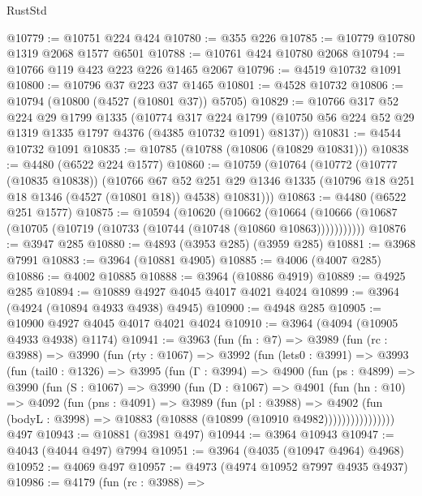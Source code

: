\begin{lexlean}{RustStd}
\begin{coremodule}
@10779 := @10751 @224 @424
@10780 := @355 @226
@10785 := @10779 @10780 @1319 @2068 @1577 @6501
@10788 := @10761 @424 @10780 @2068
@10794 := @10766 @119 @423 @223 @226 @1465 @2067
@10796 := @4519 @10732 @1091
@10800 := @10796 @37 @223 @37 @1465
@10801 := @4528 @10732
@10806 := @10794 (@10800 (@4527 (@10801 @37)) @5705)
@10829 := @10766
    @317
    @52
    @224
    @29
    @1799
    @1335
    (@10774
      @317
      @224
      @1799
      (@10750 @56 @224 @52 @29 @1319 @1335 @1797 @4376 (@4385 @10732 @1091) @8137))
@10831 := @4544 @10732 @1091
@10835 := @10785 (@10788 (@10806 (@10829 @10831)))
@10838 := @4480 (@6522 @224 @1577)
@10860 := @10759
    (@10764
      (@10772
        (@10777 (@10835 @10838))
        (@10766
          @67
          @52
          @251
          @29
          @1346
          @1335
          (@10796 @18 @251 @18 @1346 (@4527 (@10801 @18)) @4538)
          @10831)))
@10863 := @4480 (@6522 @251 @1577)
@10875 := @10594
    (@10620
      (@10662
        (@10664 (@10666 (@10687 (@10705 (@10719 (@10733 (@10744 (@10748 (@10860 @10863)))))))))))
@10876 := @3947 @285
@10880 := @4893 (@3953 @285) (@3959 @285)
@10881 := @3968 @7991
@10883 := @3964 (@10881 @4905)
@10885 := @4006 (@4007 @285)
@10886 := @4002 @10885
@10888 := @3964 (@10886 @4919)
@10889 := @4925 @285
@10894 := @10889 @4927 @4045 @4017 @4021 @4024
@10899 := @3964 (@4924 (@10894 @4933 @4938) @4945)
@10900 := @4948 @285
@10905 := @10900 @4927 @4045 @4017 @4021 @4024
@10910 := @3964 (@4094 (@10905 @4933 @4938) @1174)
@10941 := @3963
    (fun (fn : @7) =>
    @3989
      (fun (rc : @3988) =>
      @3990
        (fun (rty : @1067) =>
        @3992
          (fun (lets0 : @3991) =>
          @3993
            (fun (tail0 : @1326) =>
            @3995
              (fun (Γ : @3994) =>
              @4900
                (fun (ps : @4899) =>
                @3990
                  (fun (S : @1067) =>
                  @3990
                    (fun (D : @1067) =>
                    @4901
                      (fun (hn : @10) =>
                      @4092
                        (fun (pns : @4091) =>
                        @3989
                          (fun (pl : @3988) =>
                          @4902
                            (fun (bodyL : @3998) =>
                            @10883 (@10888 (@10899 (@10910 @4982))))))))))))))))
    @497
@10943 := @10881 (@3981 @497)
@10944 := @3964 @10943
@10947 := @4043 (@4044 @497) @7994
@10951 := @3964 (@4035 (@10947 @4964) @4968)
@10952 := @4069 @497
@10957 := @4973 (@4974 @10952 @7997 @4935 @4937)
@10986 := @4179
    (fun (rc : @3988) =>

\end{coremodule}
\end{lexlean}
